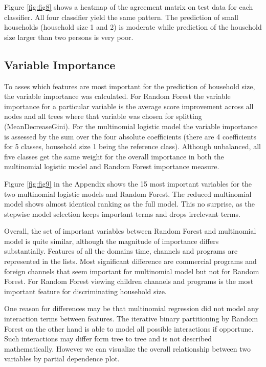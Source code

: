 \documentclass[]{article}
\begin{document}
Figure \ref{fig:fig8} shows a heatmap of the agreement matrix on test
data for each classifier. All four classifier yield the same pattern.
The prediction of small households (household size 1 and 2) is moderate
while prediction of the household size larger than two persons is very
poor.

\hypertarget{variable-importance}{%
\subsection{Variable Importance}\label{variable-importance}}

To asses which features are most important for the prediction of
household size, the variable importance was calculated. For Random
Forest the variable importance for a particular variable is the average
score improvement across all nodes and all trees where that variable was
chosen for splitting (MeanDecreaseGini). For the multinomial logistic
model the variable importance is assessed by the sum over the four
absolute coefficients (there are 4 coefficients for 5 classes, household
size 1 being the reference class). Although unbalanced, all five classes
get the same weight for the overall importance in both the multinomial
logistic model and Random Forest importance measure.

Figure \ref{fig:fig9} in the Appendix shows the 15 most important
variables for the two multinomial logistic models and Random Forest. The
reduced multinomial model shows almost identical ranking as the full
model. This no surprise, as the stepwise model selection keeps important
terms and drops irrelevant terms.

Overall, the set of important variables between Random Forest and
multinomial model is quite similar, although the magnitude of importance
differs substantially. Features of all the domains time, channels and
programs are represented in the lists. Most significant difference are
commercial programs and foreign channels that seem important for
multinomial model but not for Random Forest. For Random Forest viewing
children channels and programs is the most important feature for
discriminating household size.

One reason for differences may be that multinomial regression did not
model any interaction terms between features. The iterative binary
partitioning by Random Forest on the other hand is able to model all
possible interactions if opportune. Such interactions may differ form
tree to tree and is not described mathematically. However we can
visualize the overall relationship between two variables by partial
dependence plot.
\end{document}
